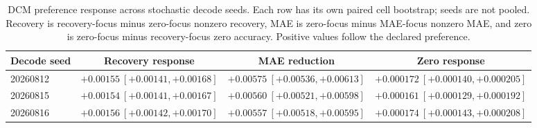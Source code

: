 \begin{table}[H]
\centering\small
\caption{DCM preference response across stochastic decode seeds. Each row has its own paired cell bootstrap; seeds are not pooled. Recovery is recovery-focus minus zero-focus nonzero recovery, MAE is zero-focus minus MAE-focus nonzero MAE, and zero is zero-focus minus recovery-focus zero accuracy. Positive values follow the declared preference.}
\label{tab:dcm_preference_replications}
\begin{tabular}{lccc}
\toprule
Decode seed & Recovery response & MAE reduction & Zero response \\
\midrule
20260812 & $+0.00155~[+0.00141,+0.00168]$ & $+0.00575~[+0.00536,+0.00613]$ & $+0.000172~[+0.000140,+0.000205]$ \\
20260815 & $+0.00154~[+0.00141,+0.00167]$ & $+0.00560~[+0.00521,+0.00598]$ & $+0.000161~[+0.000129,+0.000192]$ \\
20260816 & $+0.00156~[+0.00142,+0.00170]$ & $+0.00557~[+0.00518,+0.00595]$ & $+0.000174~[+0.000143,+0.000208]$ \\
\bottomrule
\end{tabular}
\end{table}
